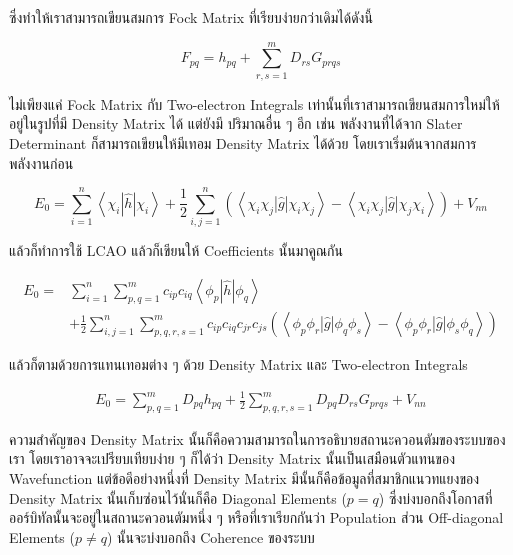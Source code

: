 \noindent ซึ่งทำให้เราสามารถเขียนสมการ Fock Matrix ที่เรียบง่ายกว่าเดิมได้ดังนี้

\begin{equation}
    \label{eq:Fock_Matrix}
    F_{p q} = h_{p q}+\sum_{r, s=1}^m D_{r s} G_{p r q s} 
\end{equation}

ไม่เพียงแค่ Fock Matrix กับ Two-electron Integrals เท่านั้นที่เราสามารถเขียนสมการใหม่ให้อยู่ในรูปที่มี Density Matrix ได้ แต่ยังมี%
ปริมาณอื่น ๆ อีก เช่น พลังงานที่ได้จาก Slater Determinant ก็สามารถเขียนให้มีเทอม Density Matrix ได้ด้วย โดยเราเริ่มต้นจากสมการ%
พลังงานก่อน

\begin{equation}
    E_0 
    = \sum_{i=1}^n \left\langle\chi_i|\hat{h}| \chi_i\right\rangle 
        + \frac{1}{2} \sum_{i, j=1}^n\left(\left\langle\chi_i \chi_j|\hat{g}| \chi_i \chi_j\right\rangle \right.
        - \left. \left\langle\chi_i \chi_j|\hat{g}| \chi_j \chi_i\right\rangle\right)+V_{n n}
\end{equation}

\noindent แล้วก็ทำการใช้ LCAO แล้วก็เขียนให้ Coefficients นั้นมาคูณกัน

\begin{equation}
    \begin{aligned}
        E_0 
        = & \sum_{i=1}^n \sum_{p, q=1}^m c_{i p} c_{i q}\left\langle\phi_p|\hat{h}| \phi_q\right\rangle \\
            & + \frac{1}{2} 
                \sum_{i, j=1}^n 
                \sum_{p, q, r, s=1}^m 
                c_{i p} c_{i q} c_{j r} c_{j s}
                \left(
                    \left\langle\phi_p \phi_r|\hat{g}| \phi_q \phi_s\right\rangle 
                    - \left\langle\phi_p \phi_r|\hat{g}| \phi_s \phi_q\right\rangle
                \right)
    \end{aligned}
\end{equation}

\noindent แล้วก็ตามด้วยการแทนเทอมต่าง ๆ ด้วย Density Matrix และ Two-electron Integrals

\begin{equation}
    \begin{aligned}
        E_0 
        = \sum_{p, q=1}^m D_{p q} h_{p q} 
            + \frac{1}{2} \sum_{p, q, r, s=1}^m D_{p q} D_{r s} G_{p r q s}+V_{n n}
    \end{aligned}
\end{equation}

ความสำคัญของ Density Matrix นั้นก็คือความสามารถในการอธิบายสถานะควอนตัมของระบบของเรา โดยเราอาจจะเปรียบเทียบง่าย ๆ ก็ได้ว่า 
Density Matrix นั้นเป็นเสมือนตัวแทนของ Wavefunction แต่ข้อดีอย่างหนึ่งที่ Density Matrix มีนั้นก็คือข้อมูลที่สมาชิกแนวทแยงของ 
Density Matrix นั้นเก็บซ่อนไว้นั่นก็คือ Diagonal Elements ($p = q$) ซึ่งบ่งบอกถึงโอกาสที่ออร์บิทัลนั้นจะอยู่ในสถานะควอนตัมหนึ่ง ๆ 
หรือที่เราเรียกกันว่า Population ส่วน Off-diagonal Elements ($p \neq q$) นั้นจะบ่งบอกถึง Coherence ของระบบ

